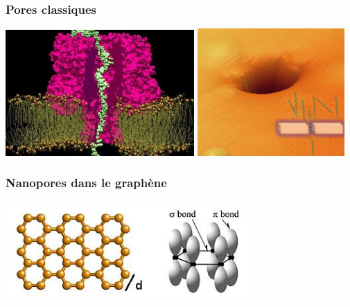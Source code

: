 \documentclass{beamer}
\begin{document}
\frame
{
\frametitle{Pores classiques}

\includegraphics[width=0.54\textwidth]{biopore.jpg}\hspace{0.02\textwidth} \includegraphics[width=0.42\textwidth]{artificialpore.png}
\medskip
\begin{center}
\end{center}

}


\frame
{\begin{center}


\frametitle{Nanopores dans le graphène}
\includegraphics[width=0.7\textwidth]{orbitals2.jpg} 



\end{center}
}
\end{document}
